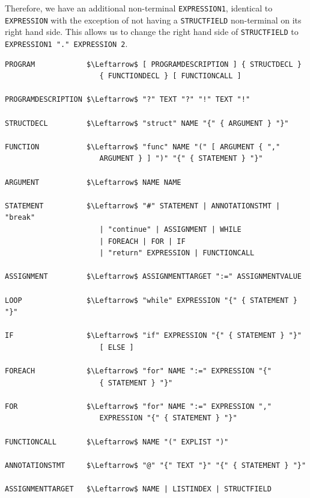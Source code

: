 Therefore, we have an additional non-terminal \texttt{EXPRESSION1}, identical to \texttt{EXPRESSION} with the exception of not having a \texttt{STRUCTFIELD} non-terminal on its right hand side. This allows us to change the right hand side of \texttt{STRUCTFIELD} to \texttt{EXPRESSION1 "." EXPRESSION 2}. \\


\begin{lstlisting}[caption={Gourmet's grammar in EBNF notation.}, captionpos=b, label={The EBNF grammar of the Gourmet programming language.}]
PROGRAM            $\Leftarrow$ [ PROGRAMDESCRIPTION ] { STRUCTDECL }
                      { FUNCTIONDECL } [ FUNCTIONCALL ]

PROGRAMDESCRIPTION $\Leftarrow$ "?" TEXT "?" "!" TEXT "!"

STRUCTDECL         $\Leftarrow$ "struct" NAME "{" { ARGUMENT } "}"

FUNCTION           $\Leftarrow$ "func" NAME "(" [ ARGUMENT { ","
                      ARGUMENT } ] ")" "{" { STATEMENT } "}"

ARGUMENT           $\Leftarrow$ NAME NAME

STATEMENT          $\Leftarrow$ "#" STATEMENT | ANNOTATIONSTMT | "break"
                      | "continue" | ASSIGNMENT | WHILE
                      | FOREACH | FOR | IF
                      | "return" EXPRESSION | FUNCTIONCALL

ASSIGNMENT         $\Leftarrow$ ASSIGNMENTTARGET ":=" ASSIGNMENTVALUE

LOOP               $\Leftarrow$ "while" EXPRESSION "{" { STATEMENT } "}"

IF                 $\Leftarrow$ "if" EXPRESSION "{" { STATEMENT } "}"
                      [ ELSE ]

FOREACH            $\Leftarrow$ "for" NAME ":=" EXPRESSION "{"
                      { STATEMENT } "}"

FOR                $\Leftarrow$ "for" NAME ":=" EXPRESSION ","
                      EXPRESSION "{" { STATEMENT } "}"

FUNCTIONCALL       $\Leftarrow$ NAME "(" EXPLIST ")"

ANNOTATIONSTMT     $\Leftarrow$ "@" "{" TEXT "}" "{" { STATEMENT } "}"

ASSIGNMENTTARGET   $\Leftarrow$ NAME | LISTINDEX | STRUCTFIELD


\end{lstlisting}
